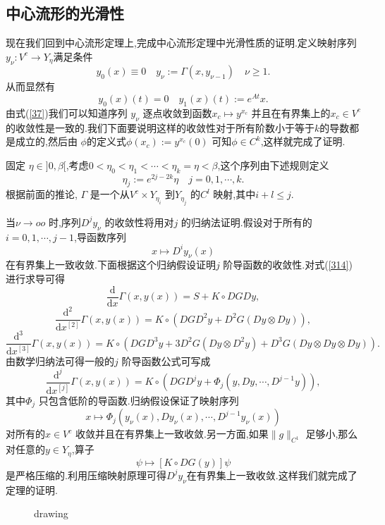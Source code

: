 \subsection{中心流形的光滑性}
现在我们回到中心流形定理上,完成中心流形定理中光滑性质的证明.定义映射序列 $y_\nu:V^{c}\to Y_\eta$满足条件
\[
  y_0(x)\equiv 0 \quad y_\nu := \Gamma (x,y_{\nu-1})\quad \nu\ge 1.		
\] 
从而显然有
\[
  y_0(x)(t)=0 \quad y_1(x)(t):=e^{At}x.	
\] 
由式(\ref{37})我们可以知道序列 $y_\nu$ 逐点收敛到函数$x_c\mapsto y^{x_c}$ 并且在有界集上的$x_c\in V^{c}$ 的收敛性是一致的.我们下面要说明这样的收敛性对于所有阶数小于等于$k$的导数都是成立的,然后由 $\phi$的定义式$\phi(x_c):=y^{x_c}(0)$ 可知$\phi \in  C^{k}$,这样就完成了证明.

固定 $\eta \in ]0,\beta[$,考虑$0<\eta_0<\eta_1<\cdots<\eta_k=\eta<\beta$,这个序列由下述规则定义
\[
\eta_j:=e^{2j-2k}\eta\quad j=0,1,\cdots,k.
\] 
根据前面的推论, $\Gamma$ 是一个从$V^{c}\times Y_{\eta_i}$ 到$Y_{\eta_j}$ 的$C^{l}$ 映射,其中$i+l\le j$.

当$\nu\to oo$ 时,序列$D^{j}y_{\nu}$ 的收敛性将用对$j$ 的归纳法证明.假设对于所有的$i=0,1,\cdots,j-1$,导函数序列
\[
  x\mapsto D^{i}y_{\nu}(x)
\] 在有界集上一致收敛.下面根据这个归纳假设证明$j$ 阶导函数的收敛性.对式(\ref{314})进行求导可得
 \[
   \frac{\mathrm{d}}{\mathrm{d}x}\Gamma(x,y(x))=S+K\circ DG Dy,
\] 
\[
  \frac{\mathrm{d}^{2}}{\mathrm{d}x^{[2]}} \Gamma(x,y(x))=K\circ \left( DG D^2y+D^2G(Dy\otimes Dy) \right),
\]
\[
  \frac{\mathrm{d}^3}{\mathrm{d}x^{[3]}}\Gamma(x,y(x))=K\circ \left( DG D^3y+3D^2G\left( Dy\otimes D^2y \right) +D^3G\left( Dy\otimes Dy\otimes Dy \right)  \right) .
\] 
由数学归纳法可得一般的$j$ 阶导函数公式可写成
\[
  \frac{\mathrm{d}^{j}}{\mathrm{d}x^{[j]}}\Gamma(x,y(x))=K\circ \left( DG D^{j}y+\Phi_j\left( y,Dy,\cdots,D^{j-1}y \right)  \right) ,
\] 
其中$\Phi_j$ 只包含低阶的导函数.归纳假设保证了映射序列
\[
  x\mapsto \Phi_j\left( y_\nu(x),Dy_\nu(x),\cdots,D^{j-1}y_\nu(x) \right) 
\] 对所有的$x\in V^{c}$ 收敛并且在有界集上一致收敛.另一方面,如果$\|g\|_{C^{1}}$ 足够小,那么对任意的$y\in Y_{\eta}$,算子
\[
  \psi\mapsto [K\circ DG(y)]\psi
\] 
是严格压缩的.利用压缩映射原理可得$D^{j}y_{\nu}$在有界集上一致收敛.这样我们就完成了定理的证明.
\begin{figure}[ht]
    \centering
    \caption{drawing}
    \label{fig:drawing}
\end{figure}
